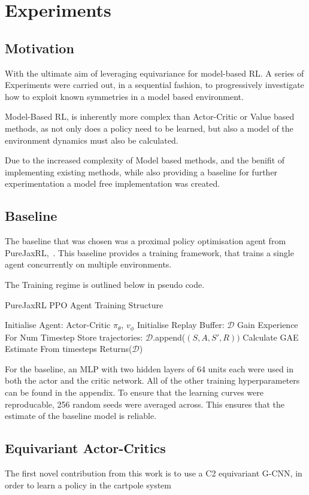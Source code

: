\chapter{Experiments}
\section{Motivation}
With the ultimate aim of leveraging equivariance for model-based RL. A series of Experiments were carried out, in a sequential fashion, to progressively investigate how to exploit known symmetries in a model based environment.

Model-Based RL, is inherently more complex than Actor-Critic or Value based methods, as not only does a policy need to be learned, but also a model of the environment dynamics must also be calculated.

Due to the increased complexity of Model based methods, and the benifit of implementing existing methods, while also providing a baseline for further experimentation a model free implementation was created.

\section{Baseline}
The baseline that was chosen was a proximal policy optimisation agent from PureJaxRL,~\cite{lu2022discovered}. This baseline provides a training framework, that trains a single agent concurrently on multiple environments.

The Training regime is outlined below in pseudo code.
\begin{algorithm}
	\caption{PureJaxRL PPO Agent Training Structure}
	\begin{algorithmic}
		\State Initialise Agent: Actor-Critic $\pi_\theta$, $v_\phi$
		\State Initialise Replay Buffer: $\mathcal{D}$
		\State Gain Experience For Num Timestep
		\State Store trajectories: $\mathcal{D}$.append($(S, A, S', R))$
		\State Calculate GAE Estimate From timesteps
		\EndFor
		\EndFor
		\State Returns($\mathcal{D}$)

	\end{algorithmic}
\end{algorithm}

For the baseline, an MLP with two hidden layers of 64 units each were used in both the actor and the critic network. All of the other training hyperparameters can be found in the appendix. To ensure that the learning curves were reproducable, 256 random seeds were averaged across. This ensures that the estimate of the baseline model is reliable.

\section{Equivariant Actor-Critics}
The first novel contribution from this work is to use a C2 equivariant G-CNN, in order to learn a policy in the cartpole system


